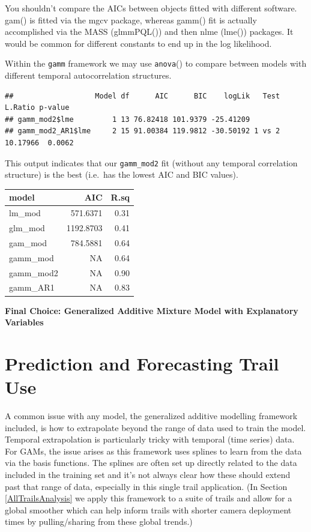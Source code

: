 \documentclass[
]{book}
\begin{document}
You shouldn't compare the AICs between objects fitted with different software. gam() is fitted via the mgcv package, whereas gamm() fit is actually accomplished via the MASS (glmmPQL()) and then nlme (lme()) packages. It would be common for different constants to end up in the log likelihood.

Within the \texttt{gamm} framework we may use \texttt{anova}() to compare between models with different temporal autocorrelation structures.

\begin{verbatim}
##                   Model df      AIC      BIC    logLik   Test  L.Ratio p-value
## gamm_mod2$lme         1 13 76.82418 101.9379 -25.41209                        
## gamm_mod2_AR1$lme     2 15 91.00384 119.9812 -30.50192 1 vs 2 10.17966  0.0062
\end{verbatim}

This output indicates that our \texttt{gamm\_mod2} fit (without any temporal correlation structure) is the best (i.e.~has the lowest AIC and BIC values).

\begin{tabular}{lrr}
\toprule
model & AIC & R.sq\\
\midrule
lm\_mod & 571.6371 & 0.31\\
glm\_mod & 1192.8703 & 0.41\\
gam\_mod & 784.5881 & 0.64\\
gamm\_mod & NA & 0.64\\
gamm\_mod2 & NA & 0.90\\
\addlinespace
gamm\_AR1 & NA & 0.83\\
\bottomrule
\end{tabular}

\textbf{Final Choice: Generalized Additive Mixture Model with Explanatory Variables}

\hypertarget{MidCotPred}{%
\section{Prediction and Forecasting Trail Use}\label{MidCotPred}}

A common issue with any model, the generalized additive modelling framework included, is how to extrapolate beyond the range of data used to train the model. Temporal extrapolation is particularly tricky with temporal (time series) data. For GAMs, the issue arises as this framework uses splines to learn from the data via the basis functions. The splines are often set up directly related to the data included in the training set and it's not always clear how these should extend past that range of data, especially in this single trail application. (In Section \ref{AllTrailsAnalysis} we apply this framework to a suite of trails and allow for a global smoother which can help inform trails with shorter camera deployment times by pulling/sharing from these global trends.)
\end{document}
